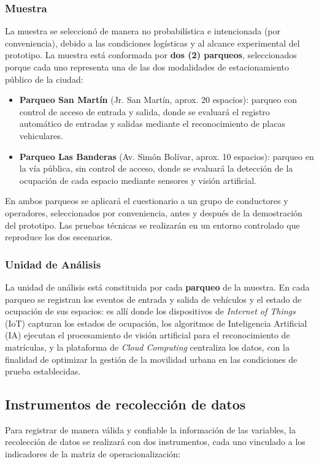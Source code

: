 \documentclass[12pt,a4paper]{article}
\begin{document}
\subsubsection{Muestra}
La muestra se seleccionó de manera no probabilística e intencionada (por conveniencia), debido a las condiciones logísticas y al alcance experimental del prototipo. La muestra está conformada por \textbf{dos (2) parqueos}, seleccionados porque cada uno representa una de las dos modalidades de estacionamiento público de la ciudad:
\begin{itemize}[leftmargin=*]
	\item \textbf{Parqueo San Martín} (Jr. San Martín, aprox. 20 espacios): parqueo con control de acceso de entrada y salida, donde se evaluará el registro automático de entradas y salidas mediante el reconocimiento de placas vehiculares.
	\item \textbf{Parqueo Las Banderas} (Av. Simón Bolívar, aprox. 10 espacios): parqueo en la vía pública, sin control de acceso, donde se evaluará la detección de la ocupación de cada espacio mediante sensores y visión artificial.
\end{itemize}
En ambos parqueos se aplicará el cuestionario a un grupo de conductores y operadores, seleccionados por conveniencia, antes y después de la demostración del prototipo. Las pruebas técnicas se realizarán en un entorno controlado que reproduce los dos escenarios.

\subsubsection{Unidad de Análisis}
La unidad de análisis está constituida por cada \textbf{parqueo} de la muestra. En cada parqueo se registran los eventos de entrada y salida de vehículos y el estado de ocupación de sus espacios: es allí donde los dispositivos de \textit{Internet of Things} (IoT) capturan los estados de ocupación, los algoritmos de Inteligencia Artificial (IA) ejecutan el procesamiento de visión artificial para el reconocimiento de matrículas, y la plataforma de \textit{Cloud Computing} centraliza los datos, con la finalidad de optimizar la gestión de la movilidad urbana en las condiciones de prueba establecidas.

\subsection{Instrumentos de recolección de datos}

Para registrar de manera válida y confiable la información de las variables, la recolección de datos se realizará con dos instrumentos, cada uno vinculado a los indicadores de la matriz de operacionalización:
\end{document}
